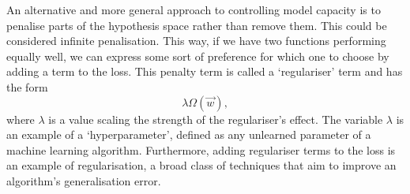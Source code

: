 An alternative and more general approach to controlling model capacity is to penalise parts of the hypothesis space rather than remove them. This could be considered infinite penalisation. This way, if we have two functions performing equally well, we can express some sort of preference for which one to choose by adding a term to the loss. This penalty term is called a `regulariser' term \cite{DeepLearningBook} and has the form
\begin{equation}
    \lambda\Omega(\vec{w}),
\end{equation}
where $\lambda$ is a value scaling the strength of the regulariser's effect. The variable $\lambda$ is an example of a `hyperparameter', defined as any unlearned parameter of a machine learning algorithm. Furthermore, adding regulariser terms to the loss is an example of regularisation, a broad class of techniques that aim to improve an algorithm's generalisation error. 


